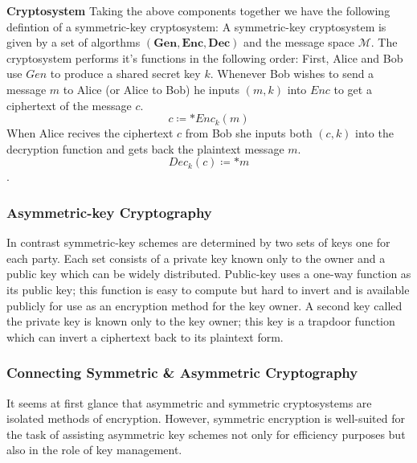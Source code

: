 \textbf{Cryptosystem}
\medskip
Taking the above components together we have the following defintion of a symmetric-key \gls{cryptosystem}:
\newline
A symmetric-key cryptosystem is given by a set of algorthms $\mathbf{(Gen, Enc, Dec)}$ and the message space $\mathcal{M}$.
\newline
The cryptosystem performs it's functions in the following order:
\newline
First, Alice and Bob use $Gen$ to produce a shared secret key $k$.
\newline
Whenever Bob wishes to send a message $m$ to Alice (or Alice to Bob) he inputs $(m,k)$ into $Enc$ to get a ciphertext of the message $c$.
$$c \coloneqq* Enc_{k}(m)$$
\newline
When Alice recives the ciphertext $c$ from Bob she inputs both $(c,k)$ into the decryption function and gets back the plaintext message $m$.
$$Dec_{k}(c) \coloneqq* m$$.





\subsubsection{Asymmetric-key Cryptography}
In contrast symmetric-key schemes are determined by two sets of keys one for each party. Each set consists of a private key known only to the owner and a public key which can be widely distributed.
Public-key uses a one-way function as its public key; this function is easy to compute but hard to invert and is available publicly for use as an encryption method for the key owner. A second key called the private key is known only to the key owner; this key is a trapdoor function which can invert a ciphertext back to its plaintext form.
 
\subsubsection{Connecting Symmetric \& Asymmetric Cryptography}
It seems at first glance that asymmetric and symmetric cryptosystems are isolated methods of encryption. However, symmetric encryption is well-suited for the task of assisting asymmetric key schemes not only for efficiency purposes but also in the role of key management. 